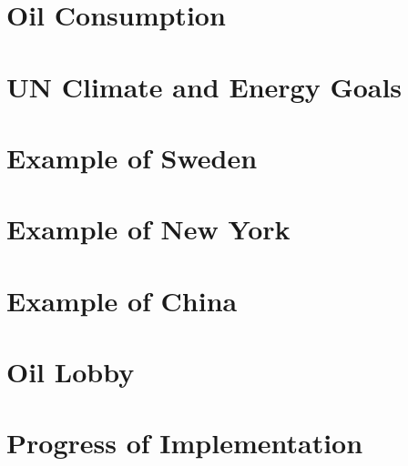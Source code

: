 \section{Oil Consumption}
\cite{Industries}
\cite{WEO}

\section{UN Climate and Energy Goals}
\cite{WEO}
\cite{Algae}
\section{Example of Sweden}
\cite{Sweden}
\section{Example of New York}
\cite{NYPlans}
\cite{NYPlan2}
\section{Example of China}
\cite{ChinaEvol}
\cite{ChinaCrit}
\section{Oil Lobby}
\section{Progress of Implementation}
\cite{NYT1}

